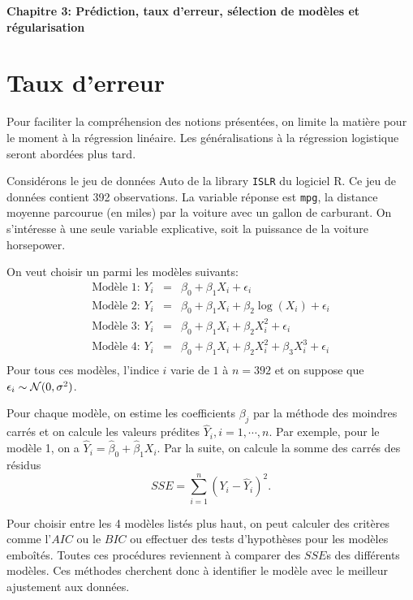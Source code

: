 \documentclass[11pt]{article}
\begin{document}
\begin{center}
{\textbf{\LARGE Chapitre 3: Pr\'ediction, taux d'erreur, s\'election de mod\`eles et r\'egularisation}}
\end{center}

\tableofcontents
\newpage

\section{Taux d'erreur}

\noindent Pour faciliter la compr\'ehension des notions pr\'esent\'ees, on limite la mati\`ere pour le moment \`a la r\'egression lin\'eaire. Les g\'en\'eralisations \`a la r\'egression logistique seront abord\'ees plus tard.

\noindent Consid\'erons le jeu de donn\'ees \textsf{Auto} de la library \texttt{ISLR} du logiciel \textrm{R}. Ce jeu de donn\'ees contient 392 observations. La variable r\'eponse est \texttt{mpg}, la distance moyenne parcourue (en miles) par la voiture avec un gallon de carburant. On s'int\'eresse \`a une seule variable explicative, soit la puissance de la voiture \textrm{horsepower}.

\noindent On veut choisir un parmi les mod\`eles suivants: 
\begin{eqnarray*}
\mbox{Mod\`ele 1: } Y_i &=& \beta_0 + \beta_1 X_i + \epsilon_i  \\
\mbox{Mod\`ele 2: } Y_i &=& \beta_0 + \beta_1 X_i + \beta_2 \log(X_i) + \epsilon_i \\
\mbox{Mod\`ele 3: } Y_i &=& \beta_0 + \beta_1 X_i + \beta_2 X_i^2 + \epsilon_i \\
\mbox{Mod\`ele 4: } Y_i &=& \beta_0 + \beta_1 X_i + \beta_2 X_i^2 + \beta_3 X_i^3 + \epsilon_i \\
\end{eqnarray*}
\noindent Pour tous ces mod\`eles, l'indice $i$ varie de $1$ \`a $n=392$ et on suppose que $\epsilon_i \sim {\cal N}(0,\sigma^2)$.

\noindent Pour chaque mod\`ele, on estime les coefficients $\beta_j$ par la m\'ethode des moindres carr\'es et on calcule les valeurs pr\'edites $\hat Y_i, i=1,\cdots,n.$ Par exemple, pour le mod\`ele 1, on a $\hat Y_i = \hat\beta_0+\hat\beta_1 X_i$. Par la suite, on calcule la somme des carr\'es des r\'esidus $$SSE=\sum\limits_{i=1}^n (Y_i-\hat Y_i)^2.$$

\noindent Pour choisir entre les 4 mod\`eles list\'es plus haut, on peut calculer des crit\`eres comme l'$AIC$ ou le $BIC$ ou effectuer des tests d'hypoth\`eses pour les mod\`eles embo\^it\'es. Toutes ces proc\'edures reviennent \`a comparer des $SSE$s des diff\'erents mod\`eles. Ces m\'ethodes cherchent donc \`a identifier le mod\`ele avec le meilleur ajustement aux donn\'ees.
\end{document}
